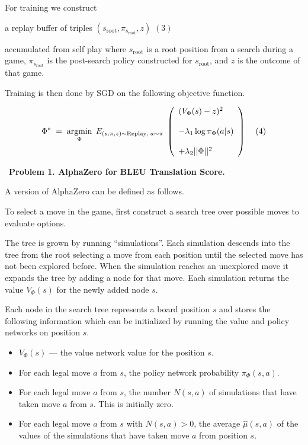 \medskip
For training we construct

\medskip
\centerline{a replay buffer of triples $(s_{\mathrm{root}},\pi_{s_{\mathrm{root}}},z)$ \hspace{2em}$(3)$}

\medskip
accumulated from self play where $s_{\mathrm{root}}$ is a root position from a search during a game,
$\pi_{s_{\mathrm{root}}}$ is the post-search policy constructed for $s_{\mathrm{root}}$, and $z$ is the outcome of that game.

\medskip
Training is then done by SGD on the following objective function.

$$\Phi^*\; = \;\operatorname*{argmin}_\Phi \;E_{(s,\pi,z) \sim \mathrm{Replay},\;a \sim \pi}\;\left(\begin{array}{l} (V_\Phi(s) - z)^2 \\ \\ - \lambda_1\log \pi_\Phi(a|s) \\ \\ + \lambda_2||\Phi||^2\end{array}\right)\;\;\;\;(4)$$

  
~{\bf Problem 1. AlphaZero for BLEU Translation Score.}

A version of AlphaZero can be defined as follows.

\medskip
To select a move in the game, first construct a search tree over possible moves to evaluate options.

\medskip
The tree is grown by running ``simulations''.  Each simulation descends into the tree from the root selecting a move from each position
until the selected move has not been explored before.  When the simulation reaches an unexplored move it expands the tree by adding a node for that move.
Each simulation returns the value $V_\Phi(s)$ for the newly added node $s$.

\medskip
Each node in the search tree represents a board position $s$ and stores the following information which can be initialized
by running the value and policy networks on position $s$.

\begin{itemize}
\item $V_\Phi(s)$ --- the value network value for the position $s$.
\item For each legal move $a$ from $s$, the policy network probability $\pi_\Phi(s,a)$.
\item For each legal move $a$ from $s$, the number $N(s,a)$ of simulations that have taken move $a$ from $s$. This is initially zero.
\item For each legal move $a$ from $s$ with $N(s,a) > 0$, the average $\hat{\mu}(s,a)$ of the values of the simulations that have
  taken move $a$ from position $s$.
\end{itemize}

